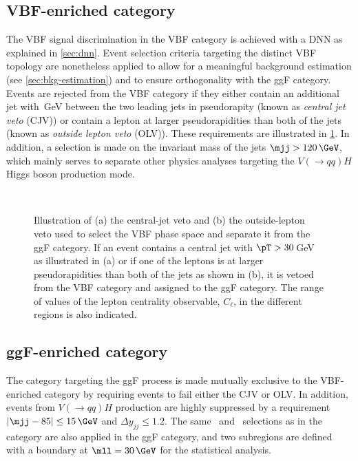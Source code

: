 \subsection{VBF-enriched \TwoJet category}
\label{subsec:vbf-category}
The VBF signal discrimination in the VBF \TwoJet category is achieved with a DNN as explained in \cref{sec:dnn}.
Event selection criteria targeting the distinct VBF topology are nonetheless applied to allow for a meaningful background estimation (see \cref{sec:bkg-estimation}) and to ensure orthogonality with the ggF \TwoJet category. 
Events are rejected from the VBF category if they either contain an additional jet with \,GeV between the two leading jets in pseudorapity (known as \emph{central jet veto} (CJV)) or contain a lepton at larger pseudorapidities than both of the jets (known as \emph{outside lepton veto} (OLV)).
These requirements are illustrated in \cref{fig:cjv-olv-illustration}. 
In addition, a selection is made on the invariant mass of the jets $\mjj > 120\,\GeV$, which mainly serves to separate other physics analyses targeting the $V(\to qq)H$ Higgs boson production mode.
\begin{figure}[ht]
   \\
  \caption{Illustration of (a) the central-jet veto and (b) the outside-lepton veto used to select the VBF phase space and separate it from the ggF \TwoJet category. If an event contains a central jet with $\pT > 30$\,GeV as illustrated in (a) or if one of the leptons is at larger pseudorapidities than both of the jets as shown in (b), it is vetoed from the VBF \TwoJet category and assigned to the ggF \TwoJet category. The range of values of the lepton centrality observable, $C_\ell$, in the different regions is also indicated. 
  \label{fig:cjv-olv-illustration}
  }
\end{figure}

\subsection{ggF-enriched \TwoJet category}
\label{subsec:ggf-two-jet-category}
The \TwoJet category targeting the ggF process is made mutually exclusive to the VBF-enriched \TwoJet category by requiring events to fail either the CJV or OLV. 
In addition, events from $V(\to qq) H$ production are highly suppressed by a requirement $|\mjj  - 85| \le 15\,\GeV$ and $\Delta y_{jj} \le 1.2$. 
The same \mll\ and \DPhill\ selections as in the \ZeroJet category are also applied in the ggF \TwoJet category, and two subregions are defined with a boundary at $\mll = 30\,\GeV$ for the statistical analysis. 

